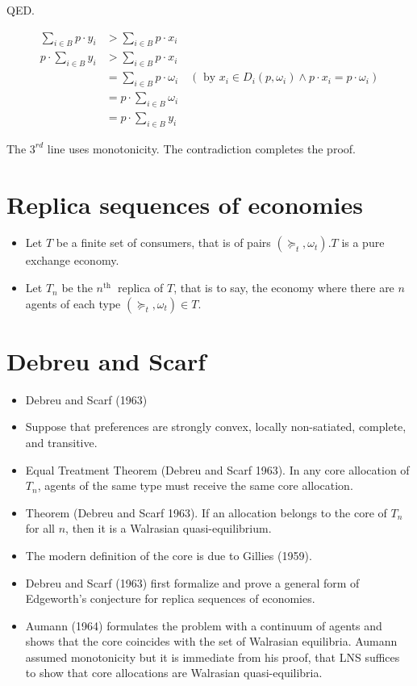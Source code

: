 \documentclass[10pt]{article}
\begin{document}
QED.

$$
\begin{aligned}
\sum_{i \in B} p \cdot y_{i} & >\sum_{i \in B} p \cdot x_{i} \\
p \cdot \sum_{i \in B} y_{i} & >\sum_{i \in B} p \cdot x_{i} \\
& =\sum_{i \in B} p \cdot \omega_{i} \quad\left(\text { by } x_{i} \in D_{i}\left(p, \omega_{i}\right) \wedge p \cdot x_{i}=p \cdot \omega_{i}\right) \\
& =p \cdot \sum_{i \in B} \omega_{i} \\
& =p \cdot \sum_{i \in B} y_{i}
\end{aligned}
$$

The $3^{r d}$ line uses monotonicity. The contradiction completes the proof.

\section*{Replica sequences of economies}
\begin{itemize}
  \item Let $T$ be a finite set of consumers, that is of pairs $\left(\succeq_{t}, \omega_{t}\right) . T$ is a pure exchange economy.
  \item Let $T_{n}$ be the $n^{\text {th }}$ replica of $T$, that is to say, the economy where there are $n$ agents of each type $\left(\succeq_{t}, \omega_{t}\right) \in T$.
\end{itemize}

\section*{Debreu and Scarf}
\begin{itemize}
  \item Debreu and Scarf (1963)
  \item Suppose that preferences are strongly convex, locally non-satiated, complete, and transitive.
  \item Equal Treatment Theorem (Debreu and Scarf 1963). In any core allocation of $T_{n}$, agents of the same type must receive the same core allocation.
  \item Theorem (Debreu and Scarf 1963). If an allocation belongs to the core of $T_{n}$ for all $n$, then it is a Walrasian quasi-equilibrium.
  \item The modern definition of the core is due to Gillies (1959).
  \item Debreu and Scarf (1963) first formalize and prove a general form of Edgeworth's conjecture for replica sequences of economies.
  \item Aumann (1964) formulates the problem with a continuum of agents and shows that the core coincides with the set of Walrasian equilibria. Aumann assumed monotonicity but it is immediate from his proof, that LNS suffices to show that core allocations are Walrasian quasi-equilibria.
\end{itemize}
\end{document}

